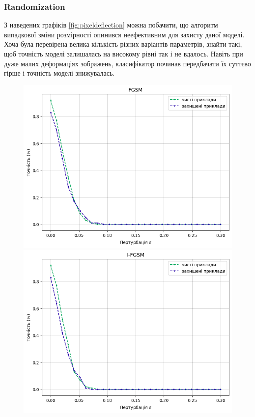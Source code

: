 \documentclass[a4paper,14pt]{extreport}
\begin{document}
	\subsubsection{Randomization}
	\noindent
	З наведених графіків \ref{fig:pixeldeflection} можна побачити, що алгоритм випадкової зміни розмірності опинився неефективним для захисту даної моделі. Хоча була перевірена велика кількість різних варіантів параметрів, знайти такі, щоб точність моделі залишалась на високому рівні так і не вдалось. Навіть при дуже малих деформаціях зображень, класифікатор починав передбачати їх суттєво гірше і точність моделі знижувалась.
	\begin{figure}[!htb]
		\includegraphics[width=1\textwidth]{resources/fgsm_rand_defence.png}
		\endminipage\hfill
		\includegraphics[width=1\textwidth]{resources/ifgsm_rand_defence.png}

\end{figure}
\end{document}
